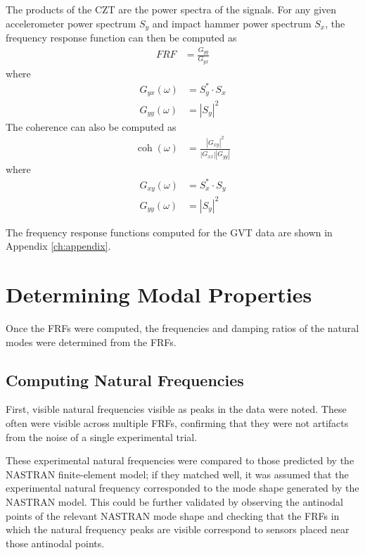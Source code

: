 The products of the CZT are the power spectra of the signals. For any given accelerometer power spectrum $S_y$ and impact hammer power spectrum $S_x$, the frequency response function can then be computed as
\begin{align}
	\label{eq:frf}
    FRF &= \frac{G_{yy}}{G_{yx}}
\end{align}
where
\begin{align}
    G_{yx}(\omega) &= S_y^* \cdot S_x \\
    G_{yy}(\omega) &= |S_y|^2
\end{align}
The coherence can also be computed as
\begin{align}
    \operatorname{coh}(\omega) &= \frac{|G_{xy}|^2}{|G_{xx}||G_{yy}|}
\end{align}
where
\begin{align}
    G_{xy}(\omega) &= S_x^* \cdot S_y \\
    G_{yy}(\omega) &= |S_y|^2
\end{align}

The frequency response functions computed for the GVT data are shown in Appendix \ref{ch:appendix}.

\section{Determining Modal Properties} %

Once the FRFs were computed, the frequencies and damping ratios of the natural modes were determined from the FRFs.

\subsection{Computing Natural Frequencies}

First, visible natural frequencies visible as peaks in the data were noted. These often were visible across multiple FRFs, confirming that they were not artifacts from the noise of a single experimental trial.

These experimental natural frequencies were compared to those predicted by the NASTRAN finite-element model; if they matched well, it was assumed that the experimental natural frequency corresponded to the mode shape generated by the NASTRAN model. This could be further validated by observing the antinodal points of the relevant NASTRAN mode shape and checking that the FRFs in which the natural frequency peaks are visible correspond to sensors placed near those antinodal points.

